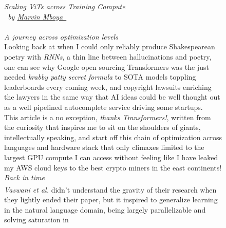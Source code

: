 \documentclass[12pt]{article}
\newcommand{\sidecite}[1]{\textsuperscript{\textcolor{blue}{\textbf{\scriptsize#1}}}}
\newcommand{\maincitecount}{\sidecite{\stepcounter{maincite}\themaincite}}
\begin{document}

\linespread{1.2}\selectfont
\author{Marvin}
\date{\today}


\begin{figure}[!htb]
    \begin{minipage}[t]{0.65\textwidth}
    {\sffamily 
    \fontsize{21}{8}\textcolor{xtitle}{\textit{Scaling ViTs across Training Compute}}\\
    \fontsize{9}{8}\textcolor{xtitle}{
        \textit{
            \ by \href{https://www.linkedin.com/in/marvin-mboya}{Marvin Mboya\ \faLinkedinSquare}
    }}\\
    }\\
    [-0.3cm]
    \textcolor{xtitle}{{\it A journey across optimization levels}}\\
    [0.2cm]
    \normalsize
    Looking back at when I could only reliably produce Shakespearean poetry with {\it RNNs}, a thin line between hallucinations 
    and poetry, one can see why Google open sourcing Transformers was the just needed {\it krabby patty secret formula} to SOTA 
    models toppling leaderboards every coming week, and copyright lawsuits enriching the lawyers in the same way that AI ideas 
    could be well thought out as a well pipelined autocomplete service driving some startups.\\ 
    This article is a no exception, {\it thanks Transformers!}, written from the curiosity that inspires me to 
    sit on the shoulders of giants, intellectually speaking, and start off this chain of optimization across languages and hardware 
    stack that only climaxes limited to the largest GPU compute I can access without feeling like I have leaked my AWS cloud keys 
    to the best crypto miners in the east continents!
    \vspace{1.5em}\\
    \fontsize{14}{8}\textcolor{xtitle}{\textit{Back in time}}\\
    {\it Vaswani et al.} didn't understand the gravity of their research{\maincitecount} when they lightly ended their paper, but 
    it inspired to generalize learning in the natural language domain, being largely parallelizable and solving saturation in 

\end{minipage}
\end{figure}
\end{document}
